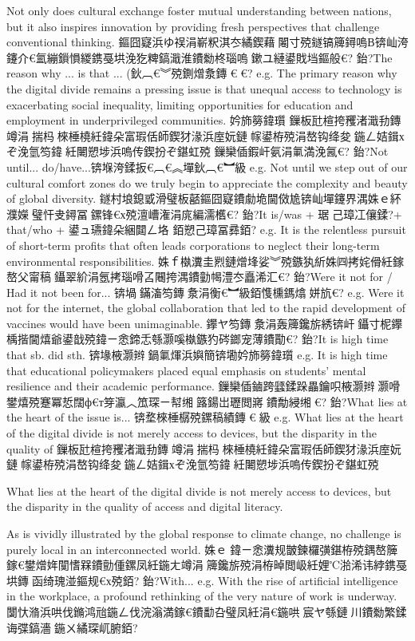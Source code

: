 ﻿\documentclass[lang=cn,11pt]{elegantbook}
\begin{document}
 Not only does cultural exchange foster mutual understanding between nations, but it also inspires innovation by
providing fresh perspectives that challenge conventional thinking.
鏂囧寲浜ゆ祦涓嶄粎淇冭繘鍥藉闂寸殑鐩镐簰鐞嗚В锛屾洿鑳介€氳繃鎻愪緵鎸戞垬浼犵粺鎬濈淮鐨勬柊瑙嗚鏉ユ縺鍙戝垱鏂般€?
鈶?The reason why ... is that ... (鈥︹€︾殑鍘熷洜鏄€︹€?
e.g. The primary reason why the digital divide remains a pressing issue is that unequal access to technology is
exacerbating social inequality, limiting opportunities for education and employment in underprivileged communities.
妗斾簩鍏瓆
鏁板瓧楦挎矡渚濈劧鏄竴涓揣杩棶棰橈紝鍏朵富瑕佸師鍥犲湪浜庢妧鏈幏鍙栫殑涓嶅钩绛夋鍦ㄥ姞鍓хぞ浼氫笉鍏紝闄愬埗浜嗚传鍥扮ぞ鍖虹殑
鏁欒偛鍜屽氨涓氭満浼氥€?
鈶?Not until... do/have...锛堢洿鍒扳€︹€︽墠鈥︹€︼級
e.g. Not until we step out of our cultural comfort zones do we truly begin to appreciate the complexity and beauty
of global diversity.
鐩村埌鎴戜滑璧板嚭鏂囧寲鐨勮垝閫傚尯锛屾墠鑳界湡姝ｅ紑濮嬫璧忓叏鐞冨鏍锋€х殑澶嶆潅涓庣編濡欍€?
鈶?It is/was + 琚己璋冮儴鍒?+ that/who + 鍙ュ瓙鍏朵綑閮ㄥ垎 銆愬己璋冨彞銆?
e.g. It is the relentless pursuit of short-term profits that often leads corporations to neglect their long-term
environmental responsibilities.
姝ｆ槸瀵圭煭鏈熷埄娑︾殑鏃犱紤姝㈣拷姹傦紝鎵嶅父甯稿鑷翠紒涓氬拷瑙嗗叾闀挎湡鐨勭幆澧冭矗浠汇€?
鈶?Were it not for / Had it not been for... 锛堝鏋滀笉鏄洜涓衡€︼級銆愯櫄鎷熻姘斻€?
e.g. Were it not for the internet, the global collaboration that led to the rapid development of vaccines would have
been unimaginable.
鑻ヤ笉鏄洜涓轰簰鑱旂綉锛屽鑷寸柅鑻楀揩閫熺爺鍙戠殑鍏ㄧ悆鍗忎綔灏嗘槸鏃犳硶鎯宠薄鐨勩€?
鈶?It is high time that sb. did sth. 锛堟棭灏辫鍋氭煇浜嬩簡锛墈妗斾簩鍏瓆
e.g. It is high time that educational policymakers placed equal emphasis on students' mental resilience and their
academic performance.
鏁欒偛鏀跨瓥鍒跺畾鑰呮棭灏辫灏嗗鐢熺殑蹇冪悊闊ф€т笌瀛︿笟琛ㄧ幇缃簬鍚岀瓑閲嶈鐨勪綅缃€?
鈶?What lies at the heart of the issue is... 锛堥棶棰樼殑鏍稿績鏄€︼級
e.g. What lies at the heart of the digital divide is not merely access to devices, but the disparity in the quality of
鏁板瓧楦挎矡渚濈劧鏄竴涓揣杩棶棰橈紝鍏朵富瑕佸師鍥犲湪浜庢妧鏈幏鍙栫殑涓嶅钩绛夋鍦ㄥ姞鍓хぞ浼氫笉鍏紝闄愬埗浜嗚传鍥扮ぞ鍖虹殑

What lies at the heart of the digital divide is not merely access to devices, but the disparity in the quality of access and digital literacy.

As is vividly illustrated by the global response to climate change, no challenge is purely local in an
interconnected world.
姝ｅ鍏ㄧ悆瀵规皵鍊欏彉鍖栫殑鍝嶅簲鎵€鐢熷姩闃愭槑鐨勯偅鏍凤紝鍦ㄤ竴涓簰鑱旂殑涓栫晫閲岋紝娌℃湁浠讳綍鎸戞垬鏄函绮瑰湴鏂规€х殑銆?
鈶?With...
e.g. With the rise of artificial intelligence in the workplace, a profound rethinking of the very nature of work is
underway.
闅忕潃浜哄伐鏅鸿兘鍦ㄥ伐浣滃満鎵€鐨勫叴璧凤紝涓€鍦哄宸ヤ綔鏈川鐨勬繁鍒诲弽鎬濇鍦ㄨ繘琛屼腑銆?
\end{document}
